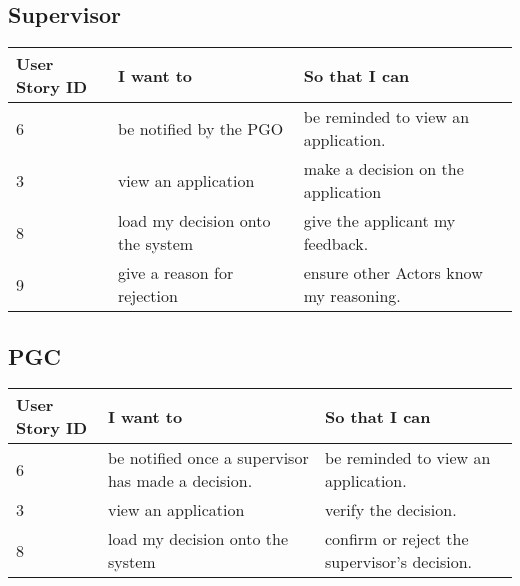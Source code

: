 \documentclass[11pt]{article}
\begin{document}
\subsection{Supervisor}
\begin{table}[H]
	\hskip-4.0cm\begin{tabular}{@{}|l|l|l|@{}}
		
	 \toprule
		\textbf{User Story ID}  & \textbf{I want to}                                & \textbf{So that I can}                                      \\ \midrule
		
	
		6                    & be notified by the PGO                            & be reminded to view an application.                              \\  \midrule
		3                    & view an application                      & make a decision on the application                    \\ \midrule
		8                    & load my decision onto the system                     & give the applicant my feedback.                                  \\ \midrule
		9                    & give a reason for rejection            & ensure  other Actors know my reasoning.                          \\ \midrule
		
		
	\end{tabular}
\end{table}
\subsection{PGC}
\begin{table}[H]
	\hskip-4.0cm\begin{tabular}{@{}|l|l|l|@{}}
	 \toprule
		\textbf{User Story ID}  & \textbf{I want to}                                & \textbf{So that I can}                                      \\ \midrule

		6                    & be notified once a supervisor has made a decision.                            & be reminded to view an application.                            \\ \midrule
		3                    & view an application                     & verify the decision.                   \\ \midrule
		8                    & load my decision onto the system                     & confirm or reject the supervisor's decision.                                         \\ \midrule
	\end{tabular}
\end{table}
\end{document}
